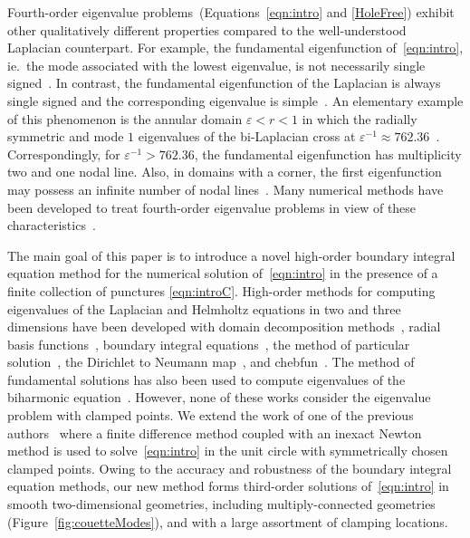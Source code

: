 \documentclass[times]{article}
\newcommand{\eps}{{\displaystyle \varepsilon}}
\begin{document}
Fourth-order eigenvalue problems~(Equations~\eqref{eqn:intro} and
\eqref{HoleFree}) exhibit other qualitatively different properties
compared to the well-understood Laplacian counterpart. For example, the
fundamental eigenfunction of~\eqref{eqn:intro}, ie.~the mode associated
with the lowest eigenvalue, is not necessarily single signed~\cite{CD1,
CD2, S, Coffman82, Gazzola2010, Grunau2014}. In contrast, the
fundamental eigenfunction of the Laplacian is always single signed and
the corresponding eigenvalue is simple~\cite{Evans2010,Gilbarg1998}.
An elementary example of this phenomenon is the annular domain
$\eps<r<1$ in which the radially symmetric and mode $1$ eigenvalues of
the bi-Laplacian cross at $\eps^{-1}\approx762.36$~\cite{CD2}.
Correspondingly, for $\eps^{-1}>762.36$, the fundamental eigenfunction
has multiplicity two and one nodal line. Also, in domains with a
corner, the first eigenfunction may possess an infinite number of nodal
lines~\cite{Coffman82}. Many numerical methods have been developed to
treat fourth-order eigenvalue problems in view of these
characteristics~\cite{brown2000, AA, CD, LC2010,
jia-kro-qua2013,Zhao2002}.

The main goal of this paper is to introduce a novel high-order boundary
integral equation method for the numerical solution of~\eqref{eqn:intro}
in the presence of a finite collection of punctures \eqref{eqn:introC}.
High-order methods for computing eigenvalues of the Laplacian and
Helmholtz equations in two and three dimensions have been developed with
domain decomposition methods~\cite{bet2007, des-tol1983, dri1997},
radial basis functions~\cite{pla-dri2004}, boundary integral
equations~\cite{bac2003, ste-ung2009, dur-ned-oss2009}, the method of
particular solution~\cite{bar2009, fox-hen-mol1967, kar2001}, the
Dirichlet to Neumann map~\cite{bar-has2014}, and chebfun~\cite{drum}.
The method of fundamental solutions has also been used to compute
eigenvalues of the biharmonic equation~\cite{mar-les2005, AA}.  However,
none of these works consider the eigenvalue problem with clamped points.
We extend the work of one of the previous authors~\cite{LHS} where a
finite difference method coupled with an inexact Newton method is used
to solve~\eqref{eqn:intro} in the unit circle with symmetrically chosen
clamped points.  Owing to the accuracy and robustness of the boundary
integral equation methods, our new method forms third-order solutions
of~\eqref{eqn:intro} in smooth two-dimensional geometries, including
multiply-connected geometries (Figure~\ref{fig:couetteModes}), and with
a large assortment of clamping locations.  
\end{document}
